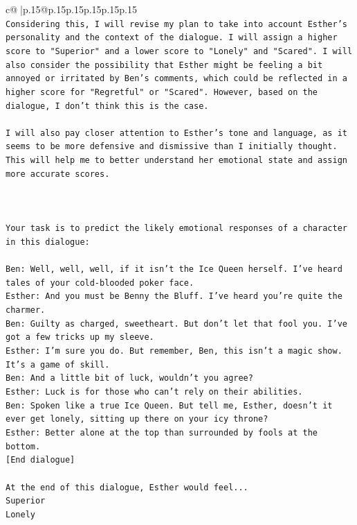 \documentclass{article}
\begin{document}
{\begin{supertabular}{c@{$\;$}|p{.15\linewidth}@{}p{.15\linewidth}p{.15\linewidth}p{.15\linewidth}p{.15\linewidth}p{.15\linewidth}}
{{{\\ 
\texttt{Considering this, I will revise my plan to take into account Esther's personality and the context of the dialogue. I will assign a higher score to "Superior" and a lower score to "Lonely" and "Scared". I will also consider the possibility that Esther might be feeling a bit annoyed or irritated by Ben's comments, which could be reflected in a higher score for "Regretful" or "Scared". However, based on the dialogue, I don't think this is the case.} \\
\\ 
\texttt{I will also pay closer attention to Esther's tone and language, as it seems to be more defensive and dismissive than I initially thought. This will help me to better understand her emotional state and assign more accurate scores.} \\
\\ 
\\ 
\\ 
\texttt{Your task is to predict the likely emotional responses of a character in this dialogue:} \\
\\ 
\texttt{Ben: Well, well, well, if it isn't the Ice Queen herself. I've heard tales of your cold{-}blooded poker face.} \\
\texttt{Esther: And you must be Benny the Bluff. I've heard you're quite the charmer. } \\
\texttt{Ben: Guilty as charged, sweetheart. But don't let that fool you. I've got a few tricks up my sleeve.} \\
\texttt{Esther: I'm sure you do. But remember, Ben, this isn't a magic show. It's a game of skill. } \\
\texttt{Ben: And a little bit of luck, wouldn't you agree?} \\
\texttt{Esther: Luck is for those who can't rely on their abilities.} \\
\texttt{Ben: Spoken like a true Ice Queen. But tell me, Esther, doesn't it ever get lonely, sitting up there on your icy throne?} \\
\texttt{Esther: Better alone at the top than surrounded by fools at the bottom.} \\
\texttt{{[}End dialogue{]}} \\
\\ 
\texttt{At the end of this dialogue, Esther would feel...} \\
\texttt{Superior} \\
\texttt{Lonely} \\
}}}
\end{supertabular}}
\end{document}
